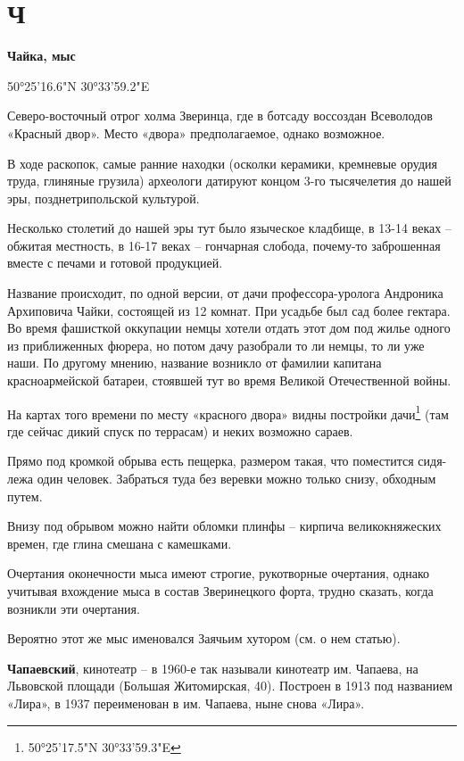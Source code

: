 \chapter*{Ч}

\textbf{Чайка, мыс}

50°25'16.6"N 30°33'59.2"E

Северо-восточный отрог холма Зверинца, где в ботсаду воссоздан Всеволодов «Красный двор». Место «двора» предполагаемое, однако возможное. 

В ходе раскопок, самые ранние находки (ос\-колки керамики, кремневые орудия труда, глиняные грузила) археологи датируют концом 3-го тысячелетия до нашей эры, позднетрипольской культурой.

Несколько столетий до нашей эры тут было языческое кладбище, в 13-14 веках – обжитая местность, в 16-17 веках – гончарная слобода, почему-то заброшенная вместе с печами и готовой продукцией.

Название происходит, по одной версии, от дачи профессора-уролога Андроника Архиповича Чайки, состоящей из 12 комнат. При усадьбе был сад более гектара. Во время фашисткой оккупации немцы хотели отдать этот дом под жилье одного из приближенных фюрера, но потом дачу разобрали то ли немцы, то ли уже наши. По другому мнению, название возникло от фамилии капитана красноармейской батареи, стоявшей тут во время Великой Отечественной войны.

На картах того времени по месту «красного двора» видны постройки дачи\footnote{50°25'17.5"N 30°33'59.3"E} (там где сейчас дикий спуск по террасам) и неких возможно сараев.

Прямо под кромкой обрыва есть пещерка, размером такая, что поместится сидя-лежа один человек. Забраться туда без веревки можно только снизу, обходным путем.

Внизу под обрывом можно найти обломки плинфы – кирпича великокняжеских времен, где глина смешана с камешками.

Очертания оконечности мыса имеют строгие, рукотворные очертания, однако учитывая вхождение мыса в состав Зверинецкого форта, трудно сказать, когда возникли эти очертания.

Вероятно этот же мыс именовался Заячьим хутором (см. о нем статью).\\ 

\medskip

\textbf{Чапаевский}, кинотеатр – в 1960-е так называли кинотеатр им. Чапаева, на Львовской площади (Большая Житомирская, 40). Построен в 1913 под названием «Лира», в 1937 переименован в им. Чапаева, ныне снова «Лира».\\

